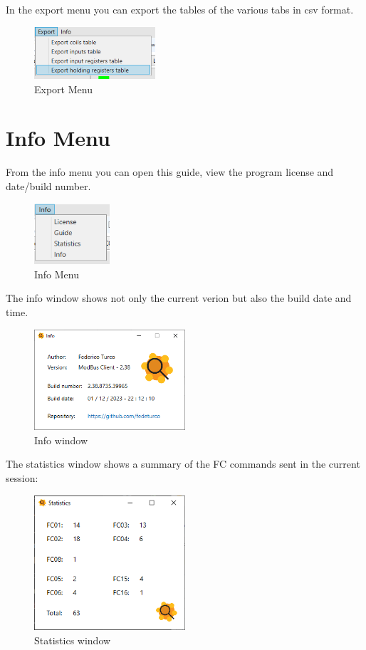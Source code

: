 In the export menu you can export the tables of the various tabs in csv format.

\begin{figure}[H]
\centering
\includegraphics[width=0.4\textwidth]{../Img/Menu_Export.PNG}
\caption{Export Menu}
\end{figure}

\section{Info Menu}

From the info menu you can open this guide, view the program license and
date/build number.

\begin{figure}[H]
\centering
\includegraphics[width=0.25\textwidth]{../Img/Menu_Info.PNG}
\caption{Info Menu}
\end{figure}

\newpage

The info window shows not only the current verion but also the build date and time.

\begin{figure}[H]
\centering
\includegraphics[width=0.5\textwidth]{../Img/Finestra_Info.PNG}
\caption{Info window}
\end{figure}

The statistics window shows a summary of the FC commands sent in the current session:

\begin{figure}[H]
\centering
\includegraphics[width=0.5\textwidth]{../Img/Finestra_Statistiche.PNG}
\caption{Statistics window}
\end{figure}